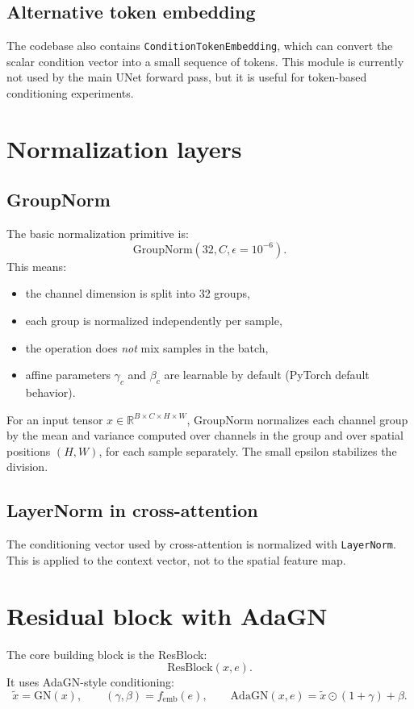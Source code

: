 \documentclass[11pt]{article}
\begin{document}
\subsection{Alternative token embedding}
The codebase also contains \texttt{ConditionTokenEmbedding}, which can convert the scalar condition vector into a small sequence of tokens. This module is currently not used by the main UNet forward pass, but it is useful for token-based conditioning experiments.

\section{Normalization layers}
\subsection{GroupNorm}
The basic normalization primitive is:
\[
\mathrm{GroupNorm}(32, C, \epsilon=10^{-6}).
\]
This means:
\begin{itemize}
  \item the channel dimension is split into 32 groups,
  \item each group is normalized independently per sample,
  \item the operation does \emph{not} mix samples in the batch,
  \item affine parameters $\gamma_c$ and $\beta_c$ are learnable by default (PyTorch default behavior).
\end{itemize}

For an input tensor $x \in \mathbb{R}^{B \times C \times H \times W}$, GroupNorm normalizes each channel group by the mean and variance computed over channels in the group and over spatial positions $(H,W)$, for each sample separately. The small epsilon stabilizes the division.

\subsection{LayerNorm in cross-attention}
The conditioning vector used by cross-attention is normalized with \texttt{LayerNorm}. This is applied to the context vector, not to the spatial feature map.

\section{Residual block with AdaGN}
The core building block is the ResBlock:
\[
\text{ResBlock}(x, e).
\]
It uses AdaGN-style conditioning:
\[
\tilde{x} = \mathrm{GN}(x), \qquad
(\gamma, \beta) = f_{\mathrm{emb}}(e),
\qquad
\mathrm{AdaGN}(x, e) = \tilde{x} \odot (1+\gamma) + \beta.
\]
\end{document}
